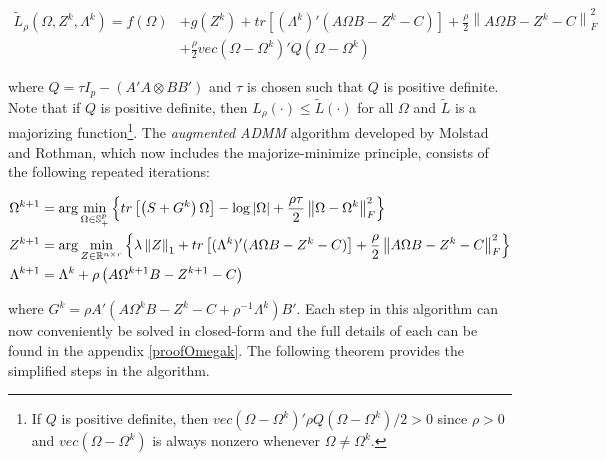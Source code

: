 \documentclass[11pt,]{report}
\theoremstyle{definition}
\theoremstyle{definition}
\theoremstyle{definition}
\theoremstyle{remark}
\begin{document}
\begin{equation}
\begin{split}
  \tilde{L}_{\rho}\left(\Omega, Z^{k}, \Lambda^{k}\right) = f\left(\Omega\right) &+ g\left(Z^{k}\right) + tr\left[(\Lambda^{k})'(A\Omega B - Z^{k} - C) \right] + \frac{\rho}{2}\left\|A\Omega B - Z^{k} - C \right\|_{F}^{2} \\
  &+ \frac{\rho}{2}vec\left(\Omega - \Omega^{k}\right)' Q\left(\Omega - \Omega^{k}\right)
\label{eq:approx}
\end{split}
\end{equation}

where \(Q = \tau I_{p} - \left(A'A \otimes BB'\right)\) and \(\tau\) is chosen such that \(Q\) is positive definite. Note that if \(Q\) is positive definite, then \(L_{\rho}\left(\cdot\right) \leq \tilde{L}\left(\cdot\right)\) for all \(\Omega\) and \(\tilde{L}\) is a majorizing function\footnote{If \(Q\) is positive definite, then \(vec\left(\Omega - \Omega^{k} \right)'\rho Q\left(\Omega - \Omega^{k} \right)/2 > 0\) since \(\rho > 0\) and \(vec\left(\Omega - \Omega^{k}\right)\) is always nonzero whenever \(\Omega \neq \Omega^{k}\).}. The \emph{augmented ADMM} algorithm developed by Molstad and Rothman, which now includes the majorize-minimize principle, consists of the following repeated iterations:

\begin{equation}
\begin{split}
  \Omega^{k + 1} &= \arg\min_{\Omega \in \mathbb{S}_{+}^{p}}\left\{tr\left[\left(S + G^{k}\right)\Omega\right] - \log\left|\Omega\right| + \frac{\rho\tau}{2}\left\|\Omega - \Omega^{k}\right\|_{F}^{2} \right\}\\
  Z^{k + 1} &= \arg\min_{Z \in \mathbb{R}^{n \times r}}\left\{\lambda\left\|Z\right\|_{1} + tr\left[(\Lambda^{k})'(A\Omega B - Z^{k} - C) \right] + \frac{\rho}{2}\left\|A\Omega B - Z^{k} - C \right\|_{F}^{2} \right\} \\
  \Lambda^{k + 1} &= \Lambda^{k} + \rho\left(A\Omega^{k + 1}B - Z^{k + 1} - C \right)
\label{eq:augADMM}\notag
\end{split}
\end{equation}

where \(G^{k} = \rho A'\left( A\Omega^{k} B - Z^{k} - C + \rho^{-1}\Lambda^{k} \right)B'\). Each step in this algorithm can now conveniently be solved in closed-form and the full details of each can be found in the appendix \ref{proofOmegak}. The following theorem provides the simplified steps in the algorithm.
\end{document}
